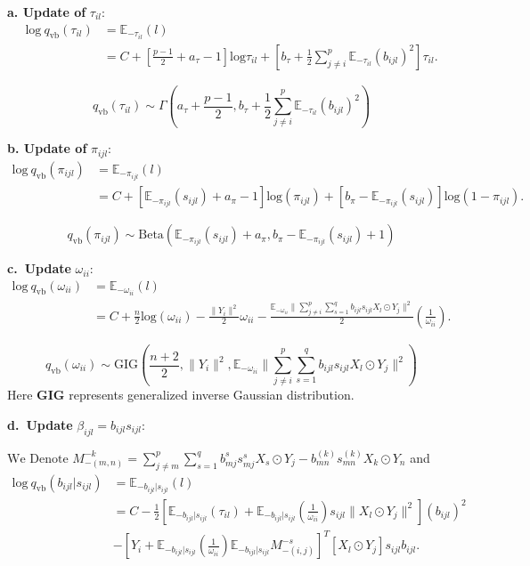 \documentclass[
]{book}
\begin{document}
\textbf{a. Update of} \(\tau_{il}\):
\begin{align}
    \text{log} \ q_{\text{vb}}(\tau_{il}) &= \mathbb{E}_{-\tau_{il}} (l) \nonumber\\
    &= C + 
    \left[
    \frac{p-1}{2}+a_\tau-1
    \right] \text{log} \tau_{il} + 
    \left[
    b_\tau + \frac{1}{2}\sum_{j \neq i}^p
    \mathbb{E}_{-\tau_{il}}
    \left(
    b_{ijl}
    \right)^2
    \right] \tau_{il}.
\end{align}

\[q_{\text{vb}}(\tau_{il}) \sim \Gamma \left(a_\tau + \frac{p-1}{2}, b_\tau + \frac{1}{2}\sum_{j \neq i}^p
    \mathbb{E}_{-\tau_{il}}\left(
    b_{ijl}
    \right)^2
    \right)\]

\textbf{b. Update of} \(\pi_{ijl}\):
\begin{align}
    \text{log} \ q_{\text{vb}}(\pi_{ijl}) 
    &= \mathbb{E}_{-\pi_{ijl}} (l) \nonumber \\
    &= C+ 
    \left[
    \mathbb{E}_{-\pi_{ijl}}(s_{ijl})+a_\pi-1
    \right] \text{log}(\pi_{ijl}) +
    \left[
    b_\pi - \mathbb{E}_{-\pi_{ijl}}(s_{ijl})
    \right] \text{log}(1-\pi_{ijl}). 
\end{align}

\[q_{\text{vb}}(\pi_{ijl}) \sim \text{Beta} \left(\mathbb{E}_{-\pi_{ijl}}(s_{ijl})+a_\pi, b_\pi - \mathbb{E}_{-\pi_{ijl}}(s_{ijl}) +1 \right)\]

\textbf{c.~Update} \(\omega_{ii}\):
\begin{align}
\text{log} \ q_{\text{vb}}(\omega_{ii}) 
&= \mathbb{E}_{-\omega_{ii}}(l) \nonumber \\
&= C+
\frac{n}{2} \text{log}(\omega_{ii}) -\frac{\|Y_i\|^2}{2} \omega_{ii} - \frac{\mathbb{E}_{-\omega_{ii}}\|\sum_{j \neq i}^p \sum_{s=1}^q b_{ijl}s_{ijl}
X_l \odot Y_j\|^2}{2} \left( \frac{1}{\omega_{ii}} \right).
\end{align}

\[q_{\text{vb}}(\omega_{ii}) \sim \text{GIG} \left(\frac{n+2}{2},\|Y_i\|^2,
\mathbb{E}_{-\omega_{ii}}\|\sum_{j \neq i}^p \sum_{s=1}^q b_{ijl}s_{ijl}
X_l \odot Y_j\|^2 \right)\]
Here \textbf{GIG} represents generalized inverse Gaussian distribution.

\textbf{d.~Update} \(\beta_{ijl} = b_{ijl}s_{ijl}\):

\(\text{We Denote } M_{-(m,n)}^{-k} = \sum_{j \neq m }^p \sum_{s=1 }^q b_{mj}^s s_{mj}^s X_s \odot Y_j - b_{mn}^{(k)} s_{mn}^{(k)} X_k \odot Y_n\) and
\begin{align}
\text{log} \ q_{\text{vb}}(b_{ijl}|s_{ijl}) 
&= \mathbb{E}_{-b_{ijl}|s_{ijl}}(l) \nonumber \\
&= C-\frac{1}{2} 
\left[
\mathbb{E}_{-b_{ijl}|s_{ijl}}(\tau_{il}) + \mathbb{E}_{-b_{ijl}|s_{ijl}} \left( \frac{1}{\omega_{ii}} \right) s_{ijl} \|X_l \odot Y_j \|^2
\right]
\left(b_{ijl}
\right)^2 \nonumber \\
&-\left[Y_i+\mathbb{E}_{-b_{ijl}|s_{ijl}} \left( \frac{1}{\omega_{ii}} \right)\mathbb{E}_{-b_{ijl}|s_{ijl}}M_{-(i,j)}^{-s}
\right]^T
\left[X_l \odot Y_j
\right] s_{ijl} b_{ijl}.
\end{align}
\end{document}
